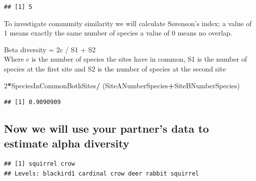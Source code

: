 \documentclass[]{book}
\newenvironment{Shaded}{\begin{snugshade}}{\end{snugshade}}
\newcommand{\DecValTok}[1]{\textcolor[rgb]{0.00,0.00,0.81}{#1}}
\newcommand{\KeywordTok}[1]{\textcolor[rgb]{0.13,0.29,0.53}{\textbf{#1}}}
\newcommand{\NormalTok}[1]{#1}
\newcommand{\OperatorTok}[1]{\textcolor[rgb]{0.81,0.36,0.00}{\textbf{#1}}}
\newcommand{\StringTok}[1]{\textcolor[rgb]{0.31,0.60,0.02}{#1}}
\begin{document}
\begin{verbatim}
## [1] 5
\end{verbatim}

To investigate community similarity we will calculate Sørenson's index; a value of 1 means exactly the same number of species a value of 0 means no overlap.

Beta diversity = 2c / S1 + S2\\
Where c is the number of species the sites have in common, S1 is the number of species at the first site and S2 is the number of species at the second site

\begin{Shaded}
\begin{Highlighting}[]
\DecValTok{2}\OperatorTok{*}\NormalTok{SpeciesInCommonBothSites}\OperatorTok{/}\StringTok{ }\NormalTok{(SiteANumberSpecies}\OperatorTok{+}\NormalTok{SiteBNumberSpecies)}
\end{Highlighting}
\end{Shaded}

\begin{verbatim}
## [1] 0.9090909
\end{verbatim}

\hypertarget{now-we-will-use-your-partners-data-to-estimate-alpha-diversity}{%
\subsection{Now we will use your partner's data to estimate alpha diversity}\label{now-we-will-use-your-partners-data-to-estimate-alpha-diversity}}

\begin{Shaded}
\end{Shaded}

\begin{verbatim}
## [1] squirrel crow    
## Levels: blackird1 cardinal crow deer rabbit squirrel
\end{verbatim}

\begin{Shaded}
\end{Shaded}
\end{document}
